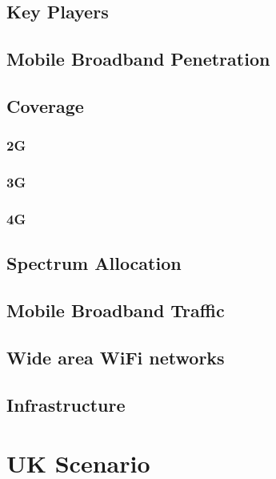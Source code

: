 \documentclass[journal]{IEEEtran}
\begin{document}
\subsection{Key Players}
\subsection{Mobile Broadband Penetration}
\subsection{Coverage}
\subsubsection{2G}
\subsubsection{3G}
\subsubsection{4G}
\subsection{Spectrum Allocation}
\subsection{Mobile Broadband Traffic}
\subsection{Wide area WiFi networks}
\subsection{Infrastructure}

\section{UK Scenario}
\end{document}
